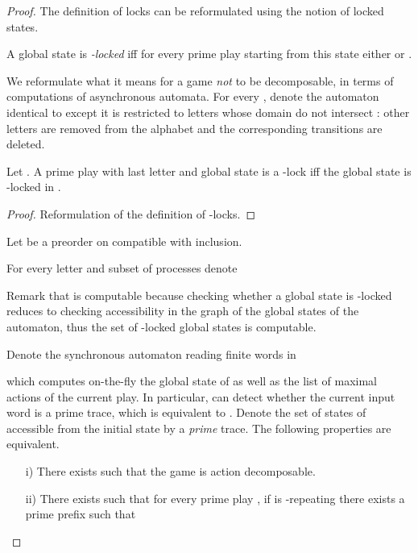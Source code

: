 \documentclass[a4paper,UKenglish]{lipics-v2016}
\begin{document}
\begin{proof}
The definition of locks can be reformulated using the notion of locked states.

\begin{definition}
A global state   is \emph{-locked}
iff for every prime play  starting from
this state
either  or .
\end{definition}

We reformulate what it means for a game \emph{not}
to be decomposable, in terms of computations of asynchronous automata.
For every  ,
denote 
the automaton identical to  except it is restricted to letters 
whose domain do not intersect :
other letters are removed from the alphabet and 
the corresponding transitions are deleted.

\begin{lemma}\label{equivlock}
Let .
A prime play with last letter  and global state  is a -lock
iff the global state 
is -locked in .
\end{lemma}
\begin{proof}
Reformulation of the definition of -locks.
\end{proof}



 \newcommand{\CC}{\mathcal{C}}
 \newcommand{\BB}{\mathcal{B}}
Let  be a preorder on  compatible with inclusion.

For every letter  and subset of processes  denote



Remark that  is computable because
checking whether a global state is -locked
reduces to checking accessibility 
in the graph of the global states of the automaton,
thus
the set of -locked global states
is computable.

Denote  the 
synchronous automaton reading finite words in
 
which computes on-the-fly the  global state of 
as well as the list  of maximal actions of the current play.
In particular,  can detect whether the current input word is a prime trace, which is equivalent to .
Denote  the set of states of 
accessible from the initial state by a \emph{prime} trace.
The following properties are equivalent.

 \begin{itemize}
 \item[i)]
 There exists  such that
 the game is  action decomposable.
 \item[ii)]
 There exists 
 such that for every prime play ,
if  is -repeating
there exists a prime prefix 
such that


\end{itemize}
\end{proof}
\end{document}
